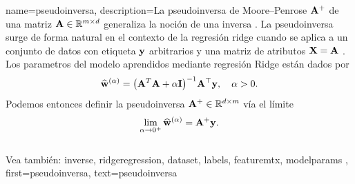 

{name={pseudoinversa},
  description={La pseudoinversa de Moore–Penrose ${\bf A}^{+}$ 
  de una matriz ${\bf A} \in \mathbb{R}^{m \times d}$ generaliza la 
  noción de una inversa \cite{GolubVanLoanBook}. La pseudoinversa surge de forma natural 
  en el contexto de la regresión ridge cuando se aplica a un conjunto de datos con etiqueta ${\bf y}$ 
  arbitrarios y una matriz de atributos ${\bf X} = {\bf A}$ \cite[Cap.\ 3]{hastie01statisticallearning}. 
  Los parametros del modelo aprendidos mediante regresión Ridge están dados por
  	\[
  	\widehat{{\bf w}}^{(\alpha)}  = \big({\bf A}^T {\bf A} + \alpha \mathbf{I} \big)^{-1} {\bf A}^\top {\bf y}, \quad \alpha > 0.
  	\]
  	Podemos entonces definir la pseudoinversa ${\bf A}^+ \in \mathbb{R}^{d \times m}$ vía 
  	el límite \cite[Cap. 3]{benisrael2003generalized}
  	\[
  	\lim_{\alpha \to 0^+} \widehat{{\bf w}}^{(\alpha)} = {\bf A}^+ {\bf y}.
  	\]
	  \\
	  Vea también: \gls{inverse}, \gls{ridgeregression}, \gls{dataset}, \glspl{label}, \gls{featuremtx}, \gls{modelparams} },
 	first={pseudoinversa},
 	text={pseudoinversa}
 }

